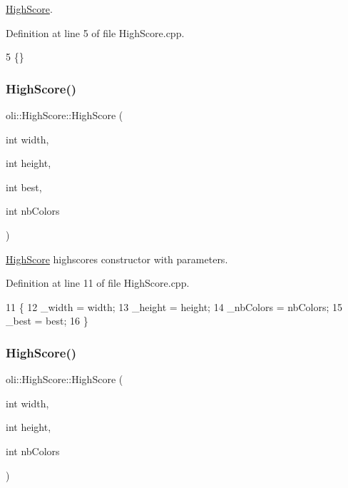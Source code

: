 \hyperlink{classoli_1_1_high_score}{High\+Score}. 



Definition at line 5 of file High\+Score.\+cpp.


\begin{DoxyCode}
5 \{\}
\end{DoxyCode}
\hypertarget{classoli_1_1_high_score_ac59979c25b9bb0d937f883dcb66a6db5}{}\label{classoli_1_1_high_score_ac59979c25b9bb0d937f883dcb66a6db5} 
\subsubsection{\texorpdfstring{High\+Score()}{HighScore()}\hspace{0.1cm}{\footnotesize\ttfamily [2/3]}}
{\footnotesize\ttfamily oli\+::\+High\+Score\+::\+High\+Score (\begin{DoxyParamCaption}\item[{int}]{width,  }\item[{int}]{height,  }\item[{int}]{best,  }\item[{int}]{nb\+Colors }\end{DoxyParamCaption})}



\hyperlink{classoli_1_1_high_score}{High\+Score} highscore\textquotesingle{}s constructor with parameters. 



Definition at line 11 of file High\+Score.\+cpp.


\begin{DoxyCode}
11                                                               \{
12     \_width = width;
13     \_height = height;
14     \_nbColors = nbColors;
15     \_best = best; 
16 \}
\end{DoxyCode}
\hypertarget{classoli_1_1_high_score_aa7566dd6d1287aa5c9a248248bf61b59}{}\label{classoli_1_1_high_score_aa7566dd6d1287aa5c9a248248bf61b59} 
\subsubsection{\texorpdfstring{High\+Score()}{HighScore()}\hspace{0.1cm}{\footnotesize\ttfamily [3/3]}}
{\footnotesize\ttfamily oli\+::\+High\+Score\+::\+High\+Score (\begin{DoxyParamCaption}\item[{int}]{width,  }\item[{int}]{height,  }\item[{int}]{nb\+Colors }\end{DoxyParamCaption})}



